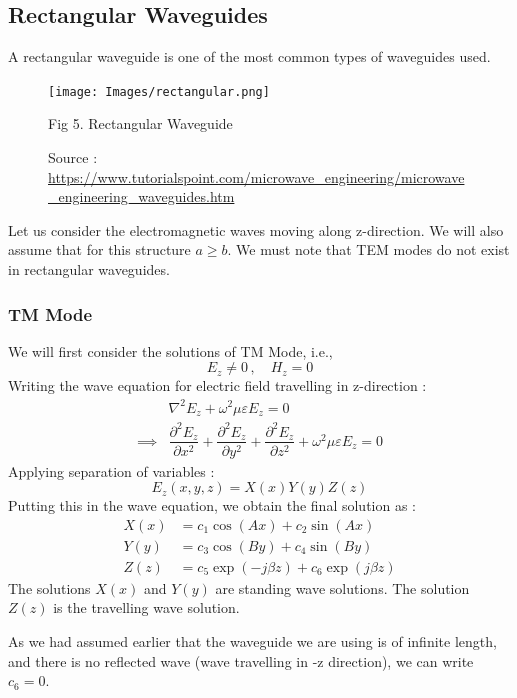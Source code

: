 \documentclass[12pt]{article}
\begin{document}
\subsection{Rectangular Waveguides}
A rectangular waveguide is one of the most common types of waveguides used. 
\begin{figure}[H]
  \centering
  \texttt{[image: Images/rectangular.png]}
  \caption{Fig 5. Rectangular Waveguide}
  \caption{\tiny Source : \url{https://www.tutorialspoint.com/microwave_engineering/microwave_engineering_waveguides.htm}}
\end{figure}
Let us consider the electromagnetic waves moving along z-direction. \linebreak
We will also assume that for this structure $a\geq b$.\linebreak
We must note that TEM modes do not exist in rectangular waveguides.
\subsubsection{TM Mode} %
We will first consider the solutions of TM Mode, i.e.,
\begin{equation*}
  E_z\neq 0 \, , \quad H_z=0
\end{equation*}
Writing the wave equation for electric field travelling in z-direction :
\begin{align*}
  & \nabla^2 E_z + \omega^2 \mu \varepsilon E_z =0 \\
  \implies & \dfrac{\partial^2 E_z}{\partial x^2}+\dfrac{\partial^2 E_z}{\partial y^2}+\dfrac{\partial^2 E_z}{\partial z^2}+\omega^2 \mu \varepsilon E_z=0 
\end{align*}
Applying separation of variables :
\begin{equation*}
  E_z(x,y,z) = X(x)Y(y)Z(z) 
\end{equation*}
Putting this in the wave equation, we obtain the final solution as :
\begin{align*}
  X(x)&= c_1 \cos(Ax)+c_2 \sin(Ax) \\
  Y(y)&= c_3 \cos(By)+c_4 \sin(By) \\
  Z(z)&= c_5 \exp(-j \beta z)+c_6 \exp(j \beta z)
\end{align*}
The solutions $X(x)$ and $Y(y)$ are standing wave solutions. The solution $Z(z)$ is the travelling wave solution.\linebreak

As we had assumed earlier that the waveguide we are using is of infinite length, and there is no reflected wave (wave travelling in -z direction), we can write $c_6=0$. \linebreak
\end{document}
